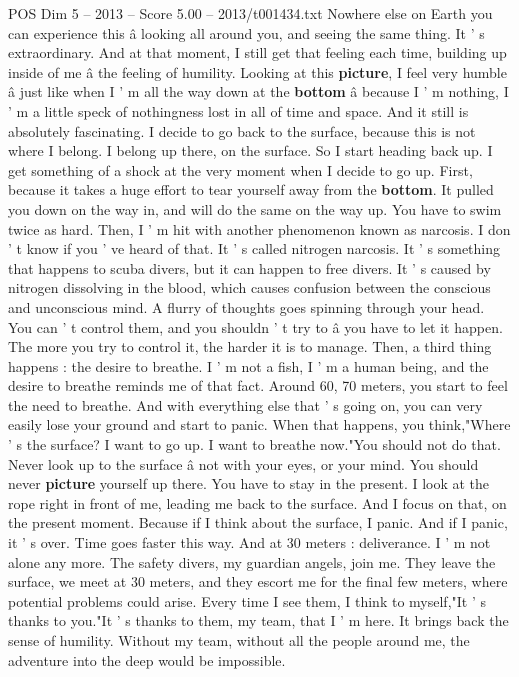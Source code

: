 \begin{textsample}{POS Dim 5 – 2013 – Score 5.00 – 2013/t001434.txt}
Nowhere else on Earth you can experience this â looking all around you, and seeing the same thing.
It ' s extraordinary.
And at that moment, I still get that feeling each time, building up inside of me â the feeling of humility.
Looking at this \textbf{picture}, I feel very humble â just like when I ' m all the way down at the \textbf{bottom} â because I ' m nothing, I ' m a little speck of nothingness lost in all of time and space.
And it still is absolutely fascinating.
I decide to go back to the surface, because this is not where I belong.
I belong up there, on the surface.
So I start heading back up.
I get something of a shock at the very moment when I decide to go up.
First, because it takes a huge effort to tear yourself away from the \textbf{bottom}.
It pulled you down on the way in, and will do the same on the way up.
You have to swim twice as hard.
Then, I ' m hit with another phenomenon known as narcosis.
I don ' t know if you ' ve heard of that.
It ' s called nitrogen narcosis.
It ' s something that happens to scuba divers, but it can happen to free divers.
It ' s caused by nitrogen dissolving in the blood, which causes confusion between the conscious and unconscious mind.
A flurry of thoughts goes spinning through your head.
You can ' t control them, and you shouldn ' t try to â you have to let it happen.
The more you try to control it, the harder it is to manage.
Then, a third thing happens : the desire to breathe.
I ' m not a fish, I ' m a human being, and the desire to breathe reminds me of that fact.
Around 60, 70 meters, you start to feel the need to breathe.
And with everything else that ' s going on, you can very easily lose your ground and start to panic.
When that happens, you think,"Where ' s the surface?
I want to go up.
I want to breathe now."You should not do that.
Never look up to the surface â not with your eyes, or your mind.
You should never \textbf{picture} yourself up there.
You have to stay in the present.
I look at the rope right in front of me, leading me back to the surface.
And I focus on that, on the present moment.
Because if I think about the surface, I panic.
And if I panic, it ' s over.
Time goes faster this way.
And at 30 meters : deliverance.
I ' m not alone any more.
The safety divers, my guardian angels, join me.
They leave the surface, we meet at 30 meters, and they escort me for the final few meters, where potential problems could arise.
Every time I see them, I think to myself,"It ' s thanks to you."It ' s thanks to them, my team, that I ' m here.
It brings back the sense of humility.
Without my team, without all the people around me, the adventure into the deep would be impossible.

\end{textsample}

